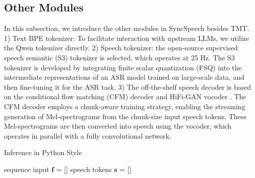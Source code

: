 \subsection{Other Modules}
\label{sec:other modules}
In this subsection, we introduce the other modules in SyncSpeech besides TMT. 
1) Text BPE tokenizer: To facilitate interaction with upstream LLMs, we  utilize the Qwen tokenizer \cite{qwen} directly. 2) Speech tokenizer:   the open-source supervised speech semantic (S3) tokenizer \cite{cosyvoice2.0} is selected, which operates at 25 Hz. The S3 tokenizer is developed by integrating finite scalar quantization (FSQ) \cite{fsq} into the intermediate representations of an ASR model trained on large-scale data, and then fine-tuning it for the ASR task.
3) The off-the-shelf speech decoder \cite{cosyvoice2.0} is based on the conditional flow matching (CFM) decoder and HiFi-GAN vocoder \cite{hifigan}. The CFM decoder employs a chunk-aware training strategy, enabling the streaming generation of Mel-spectrograms from the chunk-size input speech tokens.  These Mel-spectrograms are then converted into speech using the vocoder, which operates in parallel with a fully convolutional network.

\begin{algorithm}[t]
    \caption{Inference in Python Style} \label{alg1}
    sequence input $\boldsymbol{f}$ = [] \;
    speech tokens $\boldsymbol{s}$ = []\;
\end{algorithm}

